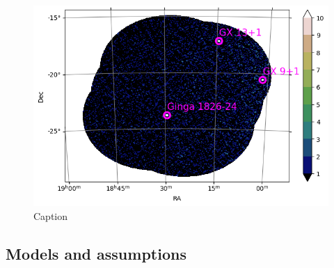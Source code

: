         \begin{figure}[H]
        \centering
        \includegraphics[width = 12cm]{report/Figures/methods/2404/oda_2404.png}
        \caption{Caption}
        \label{24_mosaic}
        \end{figure}

    
    \subsection{Models and assumptions}


